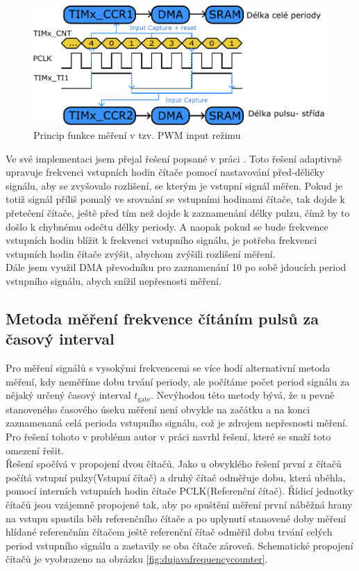  \begin{figure}[H]
 	\centering
 	\includegraphics[width=0.7\linewidth]{Figs/Diagrams/SVG/PWMINmode}
 	\caption{Princip funkce měření v tzv. PWM input režimu}
 	\label{fig:pwminmode}
 \end{figure}
 
 Ve své implementaci jsem přejal řešení popsané v práci \cite{BerlingerDIP}. Toto řešení adaptivně upravuje frekvenci vstupních hodin čítače pomocí nastavování před-děličky signálu, aby se zvyšovalo rozlišení, se kterým je vstupní signál měřen. Pokud je totiž signál příliš pomalý ve srovnání se vstupními hodinami čítače, tak dojde k přetečení čítače, ještě před tím než dojde k zaznamenání délky pulzu, čímž by to došlo k chybnému odečtu délky periody. A naopak pokud se bude frekvence vstupních hodin blížit k frekvenci vstupního signálu, je potřeba frekvenci vstupních hodin čítače zvýšit, abychom zvýšili rozlišení měření.\\
 
 Dále jsem využil DMA převodníku pro zaznamenání 10 po sobě jdoucích period vstupního signálu, abych snížil nepřesnosti měření. 
 
 \subsection{Metoda měření frekvence čítáním pulsů za časový interval}
 Pro měření signálů s vysokými frekvencemi se více hodí alternativní metoda měření, kdy neměříme dobu trvání periody, ale počítáme počet period signálu za nějaký určený časový interval $t_{\text{gate}}$. Nevýhodou této metody bývá, že u pevně stanoveného časového úseku měření není obvykle na začátku a na konci zaznamenaná celá perioda vstupního signálu, což je zdrojem nepřesnosti měření. Pro řešení tohoto v problému autor v práci \cite{DujavaDIP} navrhl řešení, které se snaží toto omezení řešit.\\
 
 Řešení spočívá v propojení dvou čítačů. Jako u obvyklého řešení první z čítačů počítá vstupní pulzy(Vstupní čítač) a druhý čítač odměřuje dobu, která uběhla, pomocí interních vstupních hodin čítače PCLK(Referenční čítač). Řídicí jednotky čítačů jsou vzájemně propojené tak, aby po spuštění měření první náběžná hrany na vstupu spustila běh referenčního čítače a po uplynutí stanovené doby měření hlídané referenčním čítačem ještě referenční čítač odměřil dobu trvání celých period vstupního signálu a zastavily se oba čítače zároveň. Schematické propojení čítačů je vyobrazeno na obrázku \ref{fig:dujavafrequencycounter}. 
 

